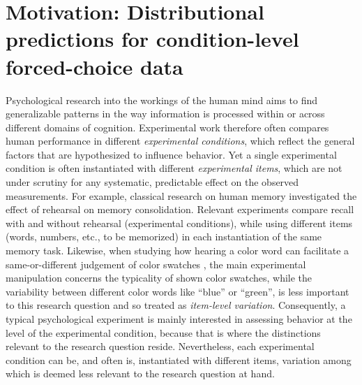 \documentclass[fleqn]{article}
\begin{document}
\section{Motivation: Distributional predictions for condition-level forced-choice data}
\label{motivation}

Psychological research into the workings of the human mind aims to find generalizable patterns in the way information is processed within or across different domains of cognition.
Experimental work therefore often compares human performance in different \emph{experimental conditions}, which reflect the general factors that are hypothesized to influence behavior.
Yet a single experimental condition is often instantiated with different \emph{experimental items}, which are not under scrutiny for any systematic, predictable effect on the observed measurements.
For example, classical research on human memory \citep{AtkinsonShiffrin1968:Human-memory:-A} investigated the effect of rehearsal on memory consolidation.
Relevant experiments compare recall with and without rehearsal (experimental conditions), while using different items (words, numbers, etc., to be memorized) in each instantiation of the same memory task.
Likewise, when studying how hearing a color word can facilitate a same-or-different judgement of color swatches \citep{Rosch1975:The-Nature-of-M}, the main experimental manipulation concerns the typicality of shown color swatches, while the variability between different color words like ``blue'' or ``green'', is less important to this research question and so treated as \emph{item-level variation}.
Consequently, a typical psychological experiment is mainly interested in assessing behavior at the level of the experimental condition, because that is where the distinctions relevant to the research question reside.
Nevertheless, each experimental condition can be, and often is, instantiated with different items, variation among which is deemed less relevant to the research question at hand.
\end{document}
